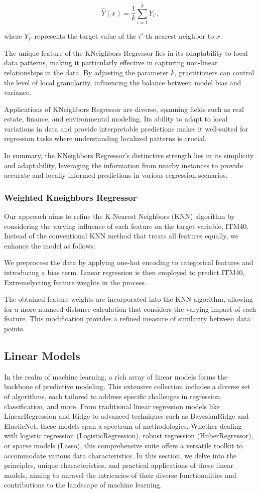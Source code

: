\documentclass[twocolumn]{article}
\begin{document}
\[ \hat{Y}(x) = \frac{1}{k} \sum_{i=1}^{k} Y_{i'}, \]

where \(Y_{i'}\) represents the target value of the \(i'\)-th nearest neighbor to \(x\).

The unique feature of the KNeighbors Regressor lies in its adaptability to local data patterns, making it particularly effective in capturing non-linear relationships in the data. By adjusting the parameter \(k\), practitioners can control the level of local granularity, influencing the balance between model bias and variance.

Applications of KNeighbors Regressor are diverse, spanning fields such as real estate, finance, and environmental modeling. Its ability to adapt to local variations in data and provide interpretable predictions makes it well-suited for regression tasks where understanding localized patterns is crucial.

In summary, the KNeighbors Regressor's distinctive strength lies in its simplicity and adaptability, leveraging the information from nearby instances to provide accurate and locally-informed predictions in various regression scenarios.
		\subsubsection{Weighted Kneighbors Regressor}
Our approach aims to refine the K-Nearest Neighbors (KNN) algorithm by considering the varying influence of each feature on the target variable, ITM40. Instead of the conventional KNN method that treats all features equally, we enhance the model as follows:

We preprocess the data by applying one-hot encoding to categorical features and introducing a bias term. Linear regression is then employed to predict ITM40, Extremelycting feature weights in the process.

The obtained feature weights are incorporated into the KNN algorithm, allowing for a more nuanced distance calculation that considers the varying impact of each feature. This modification provides a refined measure of similarity between data points.

	\subsection{Linear Models}
In the realm of machine learning, a rich array of linear models forms the backbone of predictive modeling. This extensive collection includes a diverse set of algorithms, each tailored to address specific challenges in regression, classification, and more. From traditional linear regression models like LinearRegression and Ridge to advanced techniques such as BayesianRidge and ElasticNet, these models span a spectrum of methodologies. Whether dealing with logistic regression (LogisticRegression), robust regression (HuberRegressor), or sparse models (Lasso), this comprehensive suite offers a versatile toolkit to accommodate various data characteristics. In this section, we delve into the principles, unique characteristics, and practical applications of these linear models, aiming to unravel the intricacies of their diverse functionalities and contributions to the landscape of machine learning.
\end{document}
